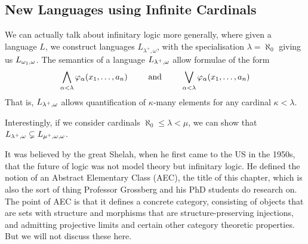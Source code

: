 \subsection{New Languages using Infinite Cardinals}

We can actually talk about infinitary logic more generally, where given a language $L$, we construct languages $L_{\lambda^+, \omega}$, with the specialisation $\lambda = \aleph_0$ giving us $L_{\omega_1, \omega}$. The semantics of a language $L_{\lambda^+, \omega}$ allow formulae of the form
\begin{align*}
    \bigwedge_{\alpha < \lambda} \varphi_{\alpha}\!\left( x_1, \ldots, a_n \right)
    \qquad \text{ and } \qquad
    \bigvee_{\alpha < \lambda} \varphi_{\alpha}\!\left( x_1, \ldots, a_n \right)
\end{align*}
That is, $L_{{\lambda}^{+}, \omega}$ allows quantification of $\kappa$-many elements for any cardinal $\kappa < \lambda$.

Interestingly, if we consider cardinals $\aleph_0 \leq \lambda < \mu$, we can show that $L_{\lambda^+, \omega} \subsetneq L_{\mu^+, \omega, \omega}$.

It was believed by the great Shelah, when he first came to the US in the 1950s, that the future of logic was not model theory but infinitary logic. He defined the notion of an Abstract Elementary Class (AEC), the title of this chapter, which is also the sort of thing Professor Grossberg and his PhD students do research on. The point of AEC is that it defines a concrete category, consisting of objects that are sets with structure and morphisms that are structure-preserving injections, and admitting projective limits and certain other category theoretic properties. But we will not discuss these here.